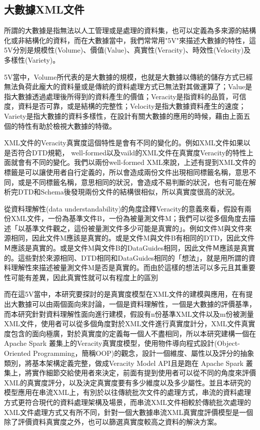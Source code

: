 \subsection{大數據XML文件}
所謂的大數據\cite{khan2014big}是指無法以人工管理或是處理的資料集，也可以定義為多來源的結構化或非結構化的資料，而在大數據當中，我們常常用"5V"來描述大數據的特性，這5V分別是規模性(Volume)、價值(Value)、真實性(Veracity)、時效性(Velocity)及多樣性(Variety)。\\\par
5V當中，Volume所代表的是大數據的規模，也就是大數據以傳統的儲存方式已經無法負荷此龐大的資料量或是傳統的資料處理方式已無法對其做運算了；Value是指大數據透過處理後所得到的資料產生的價值；Veracity是指資料的品質，可信度，資料是否可靠，或是結構的完整性；Velocity是指大數據資料產生的速度；Variety是指大數據的資料多樣性，在設計有關大數據的應用的時候，藉由上面五個的特性有助於檢視大數據的特徵。\\\par
XML文件的Veracity真實度這個特性是會有不同的變化的。例如XML文件如果以是否符合DTD規範， well-formed以及vaild的XML文件在真實度Veracity的特性上面就會有不同的變化。我們以兩份well-formed XML來說，上述有提到XML文件的標籤是可以讓使用者自行定義的，所以會造成兩份文件出現相同標籤名稱，意思不同，或是不同標籤名稱，意思相同的狀況，會造成不易判斷的狀況，也有可能在解析完DTD和Schema後發現兩份文件的結構很相似，所以真實度很高的狀況。\\\par
從資料理解性(data understandability)的角度詮釋Veracity的意義來看，假設有兩份XML文件，一份為基準文件B，一份為被量測文件M；我們可以從多個角度去描述「以基準文件觀之，這份被量測文件多少可能是真實的」。例如文件M與文件來源相同，因此文件M應該是真實的。或是文件M與文件B有相同的DTD，因此文件Ｍ應該是真實的。或是文件M與文件B的DataGuides相同，因此文件Ｍ應該是真實的。這些對於來源相同、DTD相同和DataGuides相同的「想法」，就是用所謂的資料理解性來描述被量測文件M是否是真實的。而由於這樣的想法可以多元且其重要性可能有差異，因此真實性就可以有程度上的區別\\\par

而在這5V當中，本研究要探討的是真實度模型在XML文件的建模與應用，在\cite{veracitymodel}有提出大數據可以由兩個面向來討論，一個是資料理解性，一個是大數據的評價基準，而本研究針對資料理解性面向進行建模，假設有n份基準XML文件以及m份被測量XML文件，使用者可以從多個角度對於XML文件進行真實度計分，XML文件真實度包含的面向極廣，對於真實度的定義每一個人不盡相同，所以本研究建構一個在Apache Spark 叢集上的Veracity真實度模型，使用物件導向程式設計(Object-Oriented Programming，簡稱OOP)的觀念，設計一個維度、屬性以及評分的抽象類別，將基本架構定義完整，做成Veracity Model API且是跑在 Apache Spark 叢集上，將實作細節交給使用者來決定，前面有提到使用者可以從不同的角度來評價XML的真實度評分，以及決定真實度要有多少維度以及多少屬性。並且本研究的模型應用在串流XML上，有別於以往傳統批次文件的處理方式，串流的資料處理方式更符合現代的資料處理架構及場景，而串流XML文件相較於傳統批次處理的XML文件處理方式又有所不同，針對一個大數據串流XML真實度評價模型是一個除了評價資料真實度之外，也可以篩選真實度較高之資料的解決方案。
